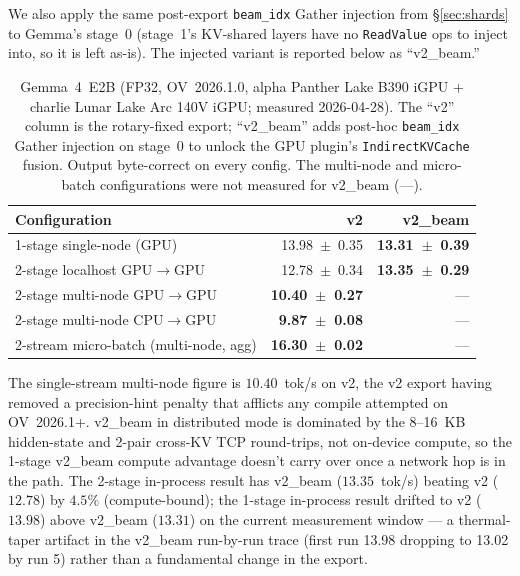 \documentclass[11pt]{article}
\newcommand{\brk}{\discretionary{}{}{}}
\begin{document}
We also apply the same post-export \texttt{beam\_idx} Gather injection from \S\ref{sec:shards} to Gemma's stage~0 (stage~1's KV-shared layers have no \texttt{ReadValue} ops to inject into, so it is left as-is). The injected variant is reported below as ``v2\_beam.''

\begin{table}[ht]
\centering
\caption{Gemma~4~E2B (FP32, OV~2026.1.0, alpha Panther Lake B390 iGPU + charlie Lunar Lake Arc 140V iGPU; measured 2026-04-28). The ``v2'' column is the rotary-fixed export; ``v2\_beam'' adds post-hoc \texttt{beam\_idx} Gather injection on stage~0 to unlock the GPU plugin's \texttt{Indirect\brk KVCache} fusion. Output byte-correct on every config. The multi-node and micro-batch configurations were not measured for v2\_beam (---).}
\label{tab:gemma_dist}
\begin{tabular}{@{}lrr@{}}
\toprule
Configuration & v2 & v2\_beam \\
\midrule
1-stage single-node (GPU) & 13.98~$\pm$~0.35 & \textbf{13.31~$\pm$~0.39} \\
2-stage localhost GPU$\rightarrow$GPU & 12.78~$\pm$~0.34 & \textbf{13.35~$\pm$~0.29} \\
2-stage multi-node GPU$\rightarrow$GPU & \textbf{10.40~$\pm$~0.27} & --- \\
2-stage multi-node CPU$\rightarrow$GPU & \textbf{9.87~$\pm$~0.08} & --- \\
2-stream micro-batch (multi-node, agg) & \textbf{16.30~$\pm$~0.02} & --- \\
\bottomrule
\end{tabular}
\end{table}

The single-stream multi-node figure is $\mathbf{10.40}$~tok/s on v2, the v2 export having removed a precision-hint penalty that afflicts any compile attempted on OV~2026.1+. v2\_beam in distributed mode is dominated by the 8--16~KB hidden-state and 2-pair cross-KV TCP round-trips, not on-device compute, so the 1-stage v2\_beam compute advantage doesn't carry over once a network hop is in the path. The 2-stage in-process result has v2\_beam ($13.35$~tok/s) beating v2 ($12.78$) by $4.5\%$ (compute-bound); the 1-stage in-process result drifted to v2 ($13.98$) above v2\_beam ($13.31$) on the current measurement window --- a thermal-taper artifact in the v2\_beam run-by-run trace (first run 13.98 dropping to 13.02 by run 5) rather than a fundamental change in the export.
\end{document}
